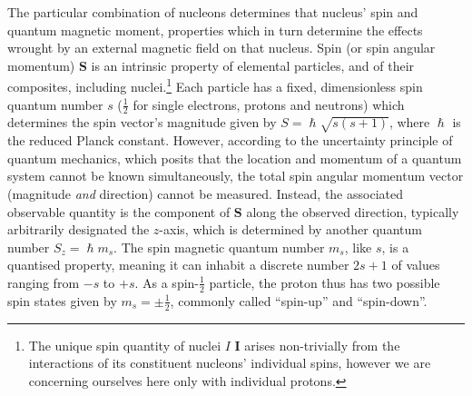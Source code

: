 \documentclass[12pt,phd,a4paper,twoside]{ucl_thesis}
\providecommand{\DIFaddtex}[1]{{\protect\color{blue} \sf #1}} %
\providecommand{\DIFdeltex}[1]{{\protect\color{red} \scriptsize #1}} %
\providecommand{\DIFaddbegin}{} %
\providecommand{\DIFaddend}{} %
\providecommand{\DIFdelbegin}{} %
\providecommand{\DIFdelend}{} %
\providecommand{\DIFadd}[1]{\texorpdfstring{\DIFaddtex{#1}}{#1}} %
\providecommand{\DIFdel}[1]{\texorpdfstring{\DIFdeltex{#1}}{}} %
\newcommand{\DIFscaledelfig}{0.5}
\newlength{\DIFdelgraphicswidth} %
\newlength{\DIFdelgraphicsheight} %
\newcommand{\DIFaddincludegraphics}[2][]{{\color{blue}\fbox{\DIFOincludegraphics[#1]{#2}}}} %
\newcommand{\DIFdelincludegraphics}[2][]{%
\sbox{\DIFdelgraphicsbox}{\DIFOincludegraphics[#1]{#2}}%
\settoboxwidth{\DIFdelgraphicswidth}{\DIFdelgraphicsbox} %
\settoboxtotalheight{\DIFdelgraphicsheight}{\DIFdelgraphicsbox} %
\scalebox{\DIFscaledelfig}{%
\parbox[b]{\DIFdelgraphicswidth}{\usebox{\DIFdelgraphicsbox}\\[-\baselineskip] \rule{\DIFdelgraphicswidth}{0em}}\llap{\resizebox{\DIFdelgraphicswidth}{\DIFdelgraphicsheight}{%
\setlength{\unitlength}{\DIFdelgraphicswidth}%
\begin{picture}(1,1)%
\thicklines\linethickness{2pt} %
{\color[rgb]{1,0,0}\put(0,0){\framebox(1,1){}}}%
{\color[rgb]{1,0,0}\put(0,0){\line( 1,1){1}}}%
{\color[rgb]{1,0,0}\put(0,1){\line(1,-1){1}}}%
\end{picture}%
}\hspace*{3pt}}} %
} %
\DeclareRobustCommand{\DIFaddbegin}{\DIFOaddbegin \let\includegraphics\DIFaddincludegraphics} %
\DeclareRobustCommand{\DIFaddend}{\DIFOaddend \let\includegraphics\DIFOincludegraphics} %
\DeclareRobustCommand{\DIFdelbegin}{\DIFOdelbegin \let\includegraphics\DIFdelincludegraphics} %
\DeclareRobustCommand{\DIFdelend}{\DIFOaddend \let\includegraphics\DIFOincludegraphics} %
\begin{document}
The particular combination of nucleons determines that nucleus' spin and quantum magnetic moment, properties which in turn determine the effects wrought by an external magnetic field on that nucleus.
Spin (or spin angular momentum) $\mathbf{S}$ is an intrinsic property of elemental particles, and of their composites, including nuclei\autocite{Eisberg1961}.\footnote[2]{The unique spin quantity of nuclei \DIFdelbegin \DIFdel{$I$ }\DIFdelend \DIFaddbegin \DIFadd{$\mathbf{I}$ }\DIFaddend arises non-trivially from the interactions of its constituent nucleons' individual spins, however we are concerning ourselves here only with individual protons.}
Each particle has a fixed, dimensionless spin quantum number $s$ ($\frac{1}{2}$ for single electrons, protons and neutrons) which determines the spin vector's magnitude given by $S = \hslash \sqrt{s(s+1)}$, where $\hslash$ is the reduced Planck constant.
However, according to the uncertainty principle of quantum mechanics, which posits that the location and momentum of a quantum system cannot be known simultaneously, the total spin angular momentum vector (magnitude \textit{and} direction) cannot be measured.
Instead, the associated observable quantity is the component of $\mathbf{S}$ along the observed direction, typically arbitrarily designated the $z$-axis, which is determined by another quantum number $S_z = \hslash m_s$.
The spin magnetic quantum number $m_s$, like $s$, is a quantised property, meaning it can inhabit a discrete number $2s+1$ of values ranging from $-s$ to $+s$.
As a spin-$\frac{1}{2}$ particle, the proton thus has two possible spin states given by $m_s = \pm \frac{1}{2}$, commonly called ``spin-up'' and ``spin-down''.
\end{document}
